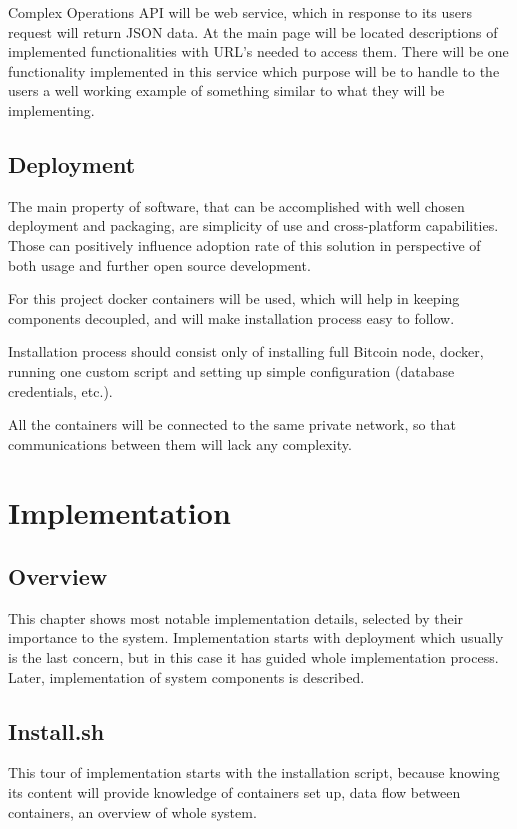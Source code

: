 \documentclass[12pt, en, eng, oneside, final]{mgr}
\begin{document}
Complex Operations API will be web service, which in response to its users request will return JSON data. At the main page will be located descriptions of implemented functionalities with URL's needed to access them. There will be one functionality implemented in this service which purpose will be to handle to the users a well working example of something similar to what they will be implementing.   

\section{Deployment}

The main property of software, that can be accomplished with well chosen deployment and packaging, are simplicity of use and cross-platform capabilities. Those can positively influence adoption rate of this solution in perspective of both usage and further open source development.

For this project docker \cite{docker} containers will be used, which will help in keeping components decoupled, and will make installation process easy to follow. 

Installation process should consist only of installing full Bitcoin node, docker, running one custom script and setting up simple configuration (database credentials, etc.).

All the containers will be connected to the same private network, so that communications between them will lack any complexity.

\chapter{Implementation}

\section{Overview}
This chapter shows most notable implementation details, selected by their importance to the system. Implementation starts with deployment which usually is the last concern, but in this case it has guided whole implementation process. Later, implementation of system components is described.

\section{Install.sh}
This tour of implementation starts with the installation script, because knowing its content will provide knowledge of containers set up, data flow between containers, an overview of whole system.
\end{document}
